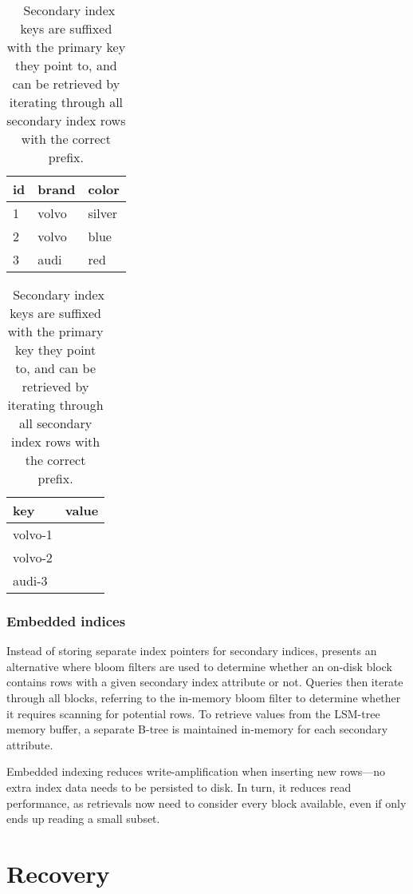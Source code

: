 \begin{table}[H]
  \centering
  \begin{tabular}[t]{l l l}
    \toprule
    \textbf{id} & \textbf{brand} & \textbf{color} \\ \midrule
    1 & volvo & silver \\ \midrule
    2 & volvo & blue \\ \midrule
    3 & audi & red \\ \bottomrule
  \end{tabular}
  \quad
  \begin{tabular}[t]{l l}
    \toprule
    \textbf{key} & \textbf{value} \\ \midrule
    volvo-1 & \\ \midrule
    volvo-2 & \\ \midrule
    audi-3 & \\ \bottomrule
  \end{tabular}

  \caption{\
    Secondary index keys are suffixed with the primary key they point to, and
    can be retrieved by iterating through all secondary index rows with the
    correct prefix.
  }\label{table:secondary-order}
\end{table}

\subsubsection{Embedded indices}

Instead of storing separate index pointers for secondary indices,
\cite{lsm-comparison} presents an alternative where bloom filters are used to
determine whether an on-disk block contains rows with a given secondary index
attribute or not. Queries then iterate through all blocks, referring to the
in-memory bloom filter to determine whether it requires scanning for potential
rows. To retrieve values from the LSM-tree memory buffer, a separate B-tree is
maintained in-memory for each secondary attribute.

Embedded indexing reduces write-amplification when inserting new rows---no
extra index data needs to be persisted to disk. In turn, it reduces read
performance, as retrievals now need to consider every block available, even if
only ends up reading a small subset.

\section{Recovery}\label{sec:recovery}

